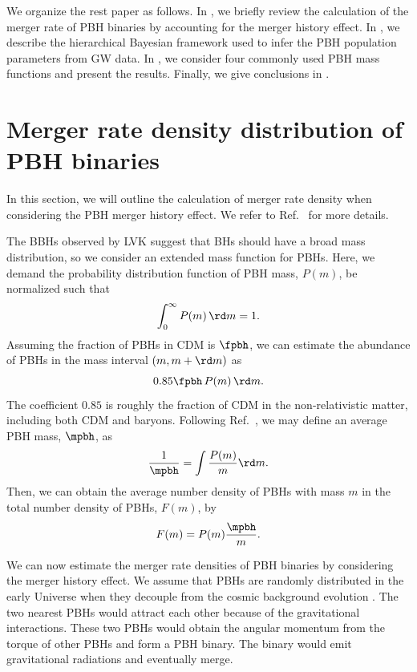 \documentclass[
reprint,           %
superscriptaddress,%
amsmath,           %
amssymb,           %
aps,               %
prd,               %
notitlepage,       %
longbibliography,  %
floatfix,          %
nofootinbib,
]{revtex4-1}
\def\e{\begin{equation}}
\def\q{\end{equation}}
\begin{document}
We organize the rest paper as follows.
In , we briefly review the calculation of the merger rate of PBH binaries by accounting for the merger history effect.
In , we describe the hierarchical Bayesian framework used to infer the PBH population parameters from GW data.
In , we consider four commonly used PBH mass functions and present the results.
Finally, we give conclusions in .

\section{\label{merger}Merger rate density distribution of PBH binaries}

In this section, we will outline the calculation of merger rate density when considering the PBH merger history effect. We refer to Ref.~\cite{Liu:2019rnx} for more details.

The BBHs observed by LVK suggest that BHs should have a broad mass distribution, so we consider an extended mass function for PBHs. Here, we demand the probability distribution function of PBH mass, $P(m)$, be normalized such that
\e\label{norm}
\int_{0}^{\infty} P(m)\, \rd m = 1.
\q 
Assuming the fraction of PBHs in CDM is $\fpbh$, we can estimate the abundance of PBHs in the mass interval $(m, m+\rd m)$ as \cite{Chen:2018rzo}
\e 
0.85 \fpbh\, P(m)\, \rd m.
\q 
The coefficient $0.85$ is roughly the fraction of CDM in the non-relativistic matter, including both CDM and baryons. Following Ref.~\cite{Liu:2019rnx}, we may define an average PBH mass, $\mpbh$, as
\e\label{mpbh}
\frac{1}{\mpbh} = \int \frac{P(m)}{m} \rd m.
\q 
Then, we can obtain the average number density of PBHs with mass $m$ in the 
total number density of PBHs, $F(m)$, by \cite{Liu:2019rnx}
\e\label{Fm} 
F(m) = P(m) \frac{\mpbh}{m}.
\q 

We can now estimate the merger rate densities of PBH binaries by considering the merger history effect.
We assume that PBHs are randomly distributed in the early Universe when they decouple from the cosmic background evolution \cite{Nakamura:1997sm,Sasaki:2016jop,Ali-Haimoud:2017rtz}. The two nearest PBHs would attract each other because of the gravitational interactions. These two PBHs would obtain the angular momentum from the torque of other PBHs and form a PBH binary. The binary would emit gravitational radiations and eventually merge. 
\end{document}
